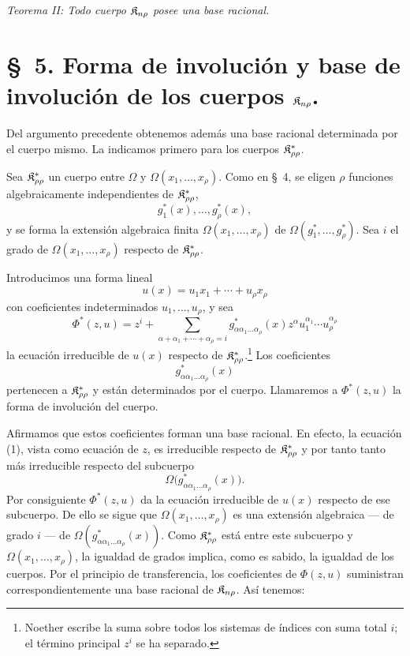\documentclass[11pt]{article}
\begin{document}
\emph{Teorema II: Todo cuerpo $\mathfrak{K}_{n\rho}$ posee una base racional.}

\section*{\S\ 5. Forma de involución y base de involución de los cuerpos $\mathfrak{K}_{n\rho}$.}

Del argumento precedente obtenemos además una base racional determinada por el cuerpo mismo. La indicamos primero para los cuerpos $\mathfrak{K}^*_{\rho\rho}$.

Sea $\mathfrak{K}^*_{\rho\rho}$ un cuerpo entre $\Omega$ y $\Omega(x_1,\ldots,x_\rho)$. Como en \S\ 4, se eligen $\rho$ funciones algebraicamente independientes de $\mathfrak{K}^*_{\rho\rho}$,
\[
  g_1^*(x),\ldots,g_\rho^*(x),
\]
y se forma la extensión algebraica finita $\Omega(x_1,\ldots,x_\rho)$ de $\Omega(g_1^*,\ldots,g_\rho^*)$. Sea $i$ el grado de $\Omega(x_1,\ldots,x_\rho)$ respecto de $\mathfrak{K}^*_{\rho\rho}$.

Introducimos una forma lineal
\[
  u(x)=u_1x_1+\cdots+u_\rho x_\rho
\]
con coeficientes indeterminados $u_1,\ldots,u_\rho$, y sea
\begin{equation}
 \Phi^*(z,u)=z^i+\sum_{\alpha+\alpha_1+\cdots+\alpha_\rho=i}
 g^*_{\alpha\alpha_1\ldots\alpha_\rho}(x)
 z^\alpha u_1^{\alpha_1}\cdots u_\rho^{\alpha_\rho}
\tag{1}
\end{equation}
la ecuación irreducible de $u(x)$ respecto de $\mathfrak{K}^*_{\rho\rho}$.\footnote{Noether escribe la suma sobre todos los sistemas de índices con suma total $i$; el término principal $z^i$ se ha separado.} Los coeficientes
\[
  g^*_{\alpha\alpha_1\ldots\alpha_\rho}(x)
\]
pertenecen a $\mathfrak{K}^*_{\rho\rho}$ y están determinados por el cuerpo. Llamaremos a $\Phi^*(z,u)$ la forma de involución del cuerpo.

Afirmamos que estos coeficientes forman una base racional. En efecto, la ecuación (1), vista como ecuación de $z$, es irreducible respecto de $\mathfrak{K}^*_{\rho\rho}$ y por tanto tanto más irreducible respecto del subcuerpo
\[
  \Omega\bigl(g^*_{\alpha\alpha_1\ldots\alpha_\rho}(x)\bigr).
\]
Por consiguiente $\Phi^*(z,u)$ da la ecuación irreducible de $u(x)$ respecto de ese subcuerpo. De ello se sigue que $\Omega(x_1,\ldots,x_\rho)$ es una extensión algebraica --- de grado $i$ --- de $\Omega(g^*_{\alpha\alpha_1\ldots\alpha_\rho}(x))$. Como $\mathfrak{K}^*_{\rho\rho}$ está entre este subcuerpo y $\Omega(x_1,\ldots,x_\rho)$, la igualdad de grados implica, como es sabido, la igualdad de los cuerpos. Por el principio de transferencia, los coeficientes de $\Phi(z,u)$ suministran correspondientemente una base racional de $\mathfrak{K}_{n\rho}$. Así tenemos:
\end{document}
